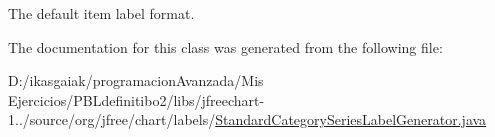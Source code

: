 The default item label format. 

The documentation for this class was generated from the following file\+:\begin{DoxyCompactItemize}
\item 
D\+:/ikasgaiak/programacion\+Avanzada/\+Mis Ejercicios/\+P\+B\+Ldefinitibo2/libs/jfreechart-\/1../source/org/jfree/chart/labels/\mbox{\hyperlink{_standard_category_series_label_generator_8java}{Standard\+Category\+Series\+Label\+Generator.\+java}}\end{DoxyCompactItemize}
